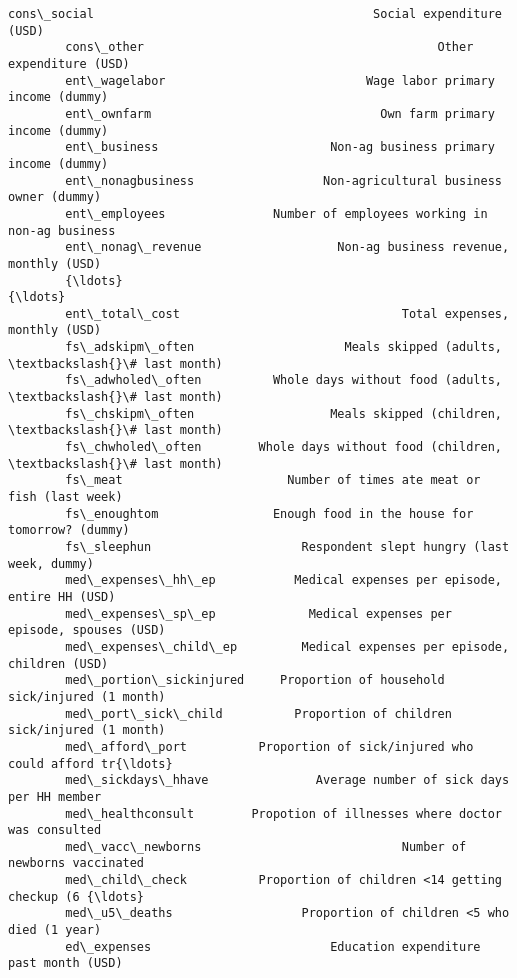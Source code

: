 \documentclass[11pt]{article}
\begin{document}
\begin{Verbatim}[commandchars=\\\{\}]
        cons\_social                                       Social expenditure (USD)   
        cons\_other                                         Other expenditure (USD)   
        ent\_wagelabor                            Wage labor primary income (dummy)   
        ent\_ownfarm                                Own farm primary income (dummy)   
        ent\_business                        Non-ag business primary income (dummy)   
        ent\_nonagbusiness                  Non-agricultural business owner (dummy)   
        ent\_employees               Number of employees working in non-ag business   
        ent\_nonag\_revenue                   Non-ag business revenue, monthly (USD)   
        {\ldots}                                                                    {\ldots}   
        ent\_total\_cost                               Total expenses, monthly (USD)   
        fs\_adskipm\_often                     Meals skipped (adults, \textbackslash{}\# last month)   
        fs\_adwholed\_often          Whole days without food (adults, \textbackslash{}\# last month)   
        fs\_chskipm\_often                   Meals skipped (children, \textbackslash{}\# last month)   
        fs\_chwholed\_often        Whole days without food (children, \textbackslash{}\# last month)   
        fs\_meat                       Number of times ate meat or fish (last week)   
        fs\_enoughtom                Enough food in the house for tomorrow? (dummy)   
        fs\_sleephun                     Respondent slept hungry (last week, dummy)   
        med\_expenses\_hh\_ep           Medical expenses per episode, entire HH (USD)   
        med\_expenses\_sp\_ep             Medical expenses per episode, spouses (USD)   
        med\_expenses\_child\_ep         Medical expenses per episode, children (USD)   
        med\_portion\_sickinjured     Proportion of household sick/injured (1 month)   
        med\_port\_sick\_child          Proportion of children sick/injured (1 month)   
        med\_afford\_port          Proportion of sick/injured who could afford tr{\ldots}   
        med\_sickdays\_hhave               Average number of sick days per HH member   
        med\_healthconsult        Propotion of illnesses where doctor was consulted   
        med\_vacc\_newborns                            Number of newborns vaccinated   
        med\_child\_check          Proportion of children <14 getting checkup (6 {\ldots}   
        med\_u5\_deaths                  Proportion of children <5 who died (1 year)   
        ed\_expenses                         Education expenditure past month (USD)   

\end{Verbatim}
\end{document}
